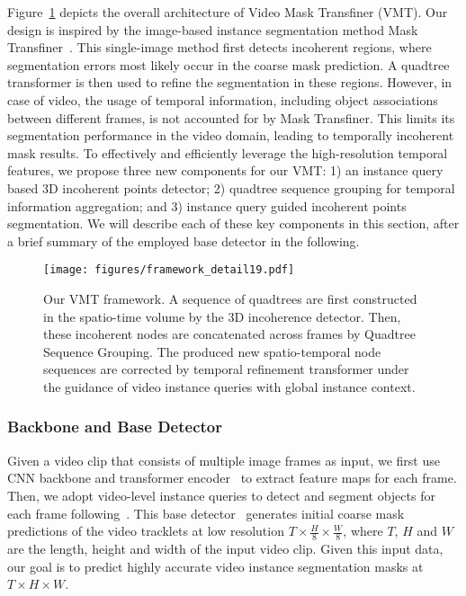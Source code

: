 \documentclass[runningheads]{llncs}
\begin{document}
Figure~\ref{fig:framework} depicts
the overall architecture of Video Mask Transfiner (VMT). Our design is inspired by the image-based instance segmentation method Mask Transfiner~\cite{transfiner}. This single-image method first detects  incoherent regions, where segmentation errors  most likely occur in the coarse mask prediction. A quadtree transformer is then used to refine the segmentation in these regions. However, in case of video, the usage of temporal information, including object associations between different frames, is not accounted for by Mask Transfiner. This limits its segmentation performance in the video domain, leading to temporally incoherent mask results. To effectively and efficiently leverage the high-resolution temporal features, we propose three new components for our VMT: 1) an instance query based 3D incoherent points detector; 2) quadtree sequence grouping for temporal information aggregation; and 3) instance query guided incoherent points segmentation. We will describe each of these key components in this section, after a brief summary of the employed base detector in the following.

\begin{figure}[!t]
	\centering
	\texttt{[image: figures/framework\_detail19.pdf]}
\caption{Our VMT framework. A sequence of quadtrees are first constructed in the spatio-time volume by the 3D incoherence detector. Then, these incoherent nodes are concatenated across frames by Quadtree Sequence Grouping. The produced new spatio-temporal node sequences are corrected by temporal refinement transformer under the guidance of video instance queries with global instance context.}
	\label{fig:framework}
\end{figure}

\subsubsection{Backbone and Base Detector} Given a
video clip that consists of multiple image frames as input, we first use CNN backbone and transformer encoder~\cite{zhu2020deformable} to extract feature maps for each frame. Then, we adopt video-level instance queries to detect and segment objects for each frame following~\cite{wu2021seqformer}. This base detector~\cite{wu2021seqformer} generates initial coarse mask predictions of the video tracklets at low resolution $T\times\frac{H}{8}\times\frac{W}{8}$, where $T$, $H$ and $W$ are the length, height and width of the input video clip. Given this input data, our goal is to predict highly accurate video instance segmentation masks at $T\times H\times W$.
\end{document}
